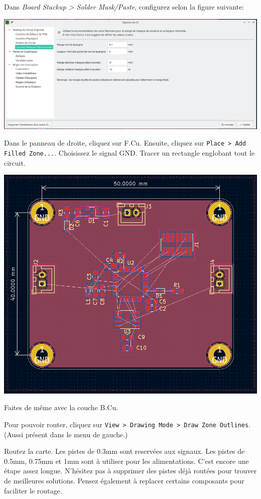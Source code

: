 \documentclass[12pt,%
addpoints,%
]{exam}
\begin{document}
\begin{questions}
	\question Dans \emph{Board Stackup > Solder Mask/Paste}, configurez selon la figure suivante:
	\begin{center}
        \includegraphics[width=\linewidth]{figures/kicad30.png}
    \end{center}

\newpage

	\question Dans le panneau de droite, cliquez sur F.Cu. 
	Ensuite, cliquez sur \texttt{Place > Add Filled Zone...}.
	Choisissez le signal GND.
	Tracer un rectangle englobant tout le circuit.

	\begin{center}
        \includegraphics[width=.8\linewidth]{figures/kicad28.png}
    \end{center}

	\question Faites de même avec la couche B.Cu.

	\question Pour pouvoir router, cliquez sur \texttt{View > Drawing Mode > Draw Zone Outlines}. (Aussi présent dans le menu de gauche.)

	\question Routez la carte. Les pistes de 0.3mm sont reservées aux signaux. Les pistes de 0.5mm, 0.75mm et 1mm sont à utiliser pour les alimentations.
	C'est encore une étape assez longue. N'hésitez pas à supprimer des pistes déjà routées pour trouver de meilleures solutions.
	Pensez également à replacer certains composants pour faciliter le routage.
\end{questions}
\end{document}

